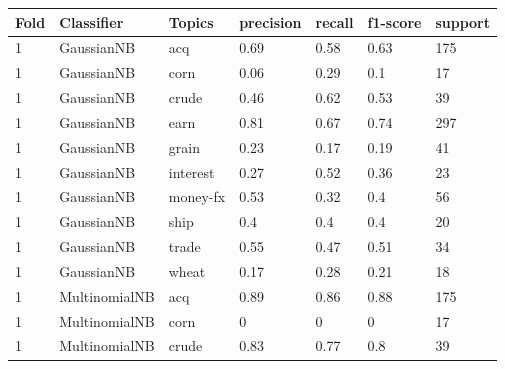 \documentclass{article}
\begin{document}
\begin{table}[h]
\begin{tabular}{lllllll}
\textbf{Fold} & \textbf{Classifier}    & \textbf{Topics} & \textbf{precision} & \textbf{recall} & \textbf{f1-score} & \textbf{support} \\ \hline
1             & GaussianNB             & acq             & 0.69               & 0.58            & 0.63              & 175              \\
1             & GaussianNB             & corn            & 0.06               & 0.29            & 0.1               & 17               \\
1             & GaussianNB             & crude           & 0.46               & 0.62            & 0.53              & 39               \\
1             & GaussianNB             & earn            & 0.81               & 0.67            & 0.74              & 297              \\
1             & GaussianNB             & grain           & 0.23               & 0.17            & 0.19              & 41               \\
1             & GaussianNB             & interest        & 0.27               & 0.52            & 0.36              & 23               \\
1             & GaussianNB             & money-fx        & 0.53               & 0.32            & 0.4               & 56               \\
1             & GaussianNB             & ship            & 0.4                & 0.4             & 0.4               & 20               \\
1             & GaussianNB             & trade           & 0.55               & 0.47            & 0.51              & 34               \\
1             & GaussianNB             & wheat           & 0.17               & 0.28            & 0.21              & 18               \\
1             & MultinomialNB          & acq             & 0.89               & 0.86            & 0.88              & 175              \\
1             & MultinomialNB          & corn            & 0                  & 0               & 0                 & 17               \\
1             & MultinomialNB          & crude           & 0.83               & 0.77            & 0.8               & 39               \\

\end{tabular}
\end{table}
\end{document}
